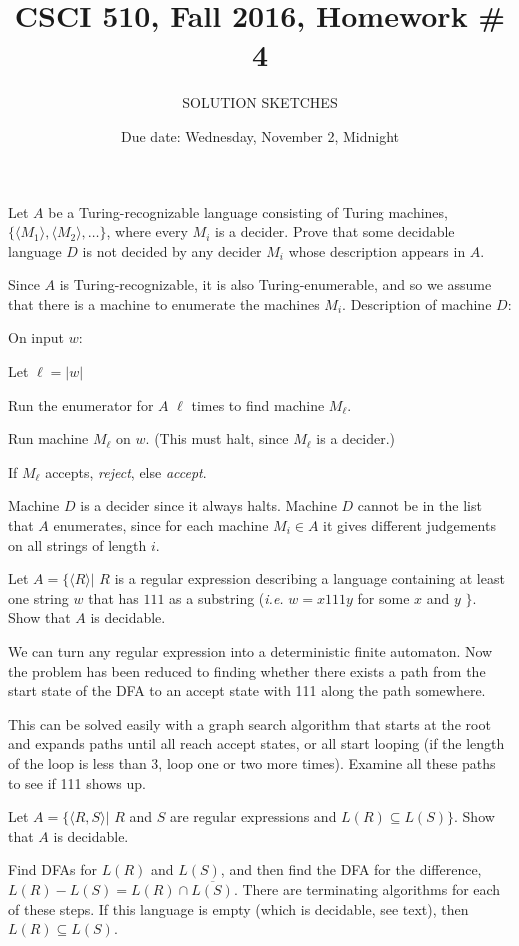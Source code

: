 \documentclass{article}
\title{CSCI 510, Fall 2016, Homework \# 4}
\author{SOLUTION SKETCHES}
\date{Due date: Wednesday, November 2, Midnight}
\begin{document}
\maketitle
\begin{enumerate}
\item Let $A$ be a Turing-recognizable language consisting of Turing
  machines, $\{\langle M_1 \rangle, \langle M_2\rangle, \ldots\}$,
  where every $M_i$ is a decider.  Prove that some decidable
  language $D$ is not decided by any decider $M_i$ whose description
  appears in $A$.

  \newcommand{\bd}{\begin{description}}
  \newcommand{\ed}{\end{description}}

  Since $A$ is Turing-recognizable, it is also Turing-enumerable, and
  so we assume that there is a machine to enumerate the machines
  $M_i$. 
  Description of machine $D$:
  
  \hrulefill
  \bd
  \item On input $w$:
    \bd
  \item Let $\ell=|w|$
  \item Run the enumerator for $A$ $\ell$ times to find machine $M_\ell$.
    \item Run machine $M_\ell$ on $w$.
  (This must halt, since $M_\ell$ is a decider.)
  \item If $M_\ell$ accepts, {\em reject}, else {\em accept}.
    \ed
    \ed
  \hrulefill

Machine $D$ is a decider since it always halts.  Machine $D$ cannot be
in the list that $A$ enumerates, since for each machine $M_i\in A$ it gives
different judgements on all strings of length $i$.

  

\item Let $A= \{\langle R\rangle | $ $R$ is a regular
  expression describing a language containing at least one string
  $w$ that has  $111$  as a substring ({\em i.e.} $w=x111y$ for
  some $x$ and $y$ $\}$.  Show that $A$ is decidable.

  We can turn any regular expression into a deterministic finite
  automaton.  Now the problem has been reduced to finding whether
  there exists a path from the start state of the DFA to an accept
  state with 111 along the path somewhere.

  This can be solved easily with a graph search algorithm that starts
  at the root and expands paths until all reach accept states, or all
  start looping (if the length of the loop is less than 3, loop one or
  two more times).  Examine all these paths to see if 111 shows up.


\item Let $A= \{\langle R, S\rangle |$ $R$ and $S$ are regular
  expressions and $L(R) \subseteq L(S)\}$.  Show that $A$ is
  decidable.

  Find DFAs for $L(R)$ and $L(S)$, and then find the DFA for the
  difference, $L(R)-L(S) = L(R)\cap \overline{L(S)}$.  There are
  terminating algorithms for each of these steps.  If this language is
  empty (which is decidable, see text), then $L(R)\subseteq L(S)$.
  
\end{enumerate}
\end{document}
